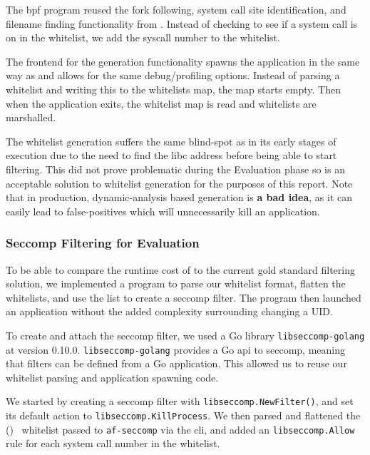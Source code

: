 The \ac{bpf} program reused the fork following, system call site identification, and
filename finding functionality from \afss. Instead of checking to see if a
system call is on in the whitelist, we add the syscall number to the whitelist. 

The frontend for the generation functionality spawns the application in the same
way as \af and allows for the same debug/profiling options. Instead of parsing a
whitelist and writing this to the whitelists map, the map starts empty. Then
when the application exits, the whitelist map is read and whitelists are
marshalled.

The whitelist generation suffers the same blind-spot as \af in its early stages
of execution due to the need to find the \ac{libc} address before being able to
start filtering. This did not prove problematic during the Evaluation phase so
is an acceptable solution to whitelist generation for the purposes of this
report. Note that in production, dynamic-analysis based generation is \textbf{a
bad idea}, as it can easily lead to false-positives which will unnecessarily
kill an application.

\subsubsection{Seccomp Filtering for Evaluation}\label{subsubsec:syso-impl}

To be able to compare the runtime cost of \af to the current gold standard
filtering solution, we implemented a program to parse our whitelist format,
flatten the whitelists, and use the list to create a seccomp filter. The program
then launched an application without the added complexity surrounding changing
a UID.

To create and attach the seccomp filter, we used a Go library 
\texttt{libseccomp-golang} at version 0.10.0. \texttt{libseccomp-golang}
provides a Go \ac{api} to seccomp, meaning that filters can be defined from a
Go application. This allowed us to reuse our whitelist parsing and application
spawning code.

We started by creating a seccomp filter with \texttt{libseccomp.NewFilter()}, 
and set its default action to \texttt{libseccomp.KillProcess}. We then parsed
and flattened the (\afss)~ whitelist passed to \texttt{af-seccomp} via the
\ac{cli}, and added an \texttt{libseccomp.Allow} rule for each system call number in
the whitelist.


